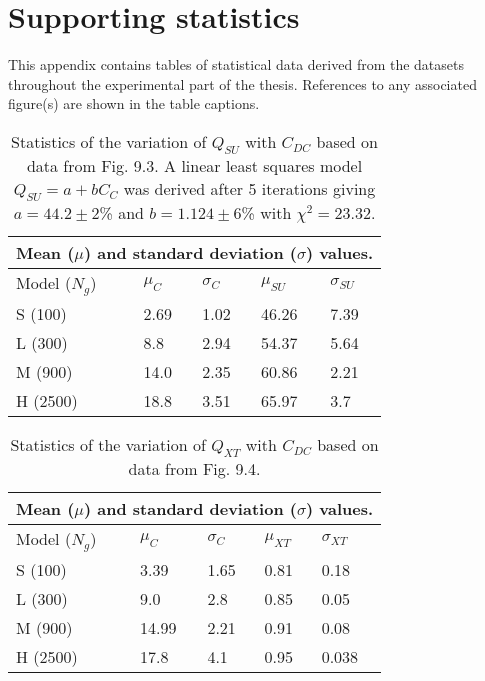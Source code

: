 \section{Supporting statistics}
\label{sect:app_stats}

This appendix contains tables of statistical data derived from the datasets throughout the experimental part of the thesis. References to any associated figure(s) are shown in the table captions.


\begin{table}[h]
\begin{center}
\begin{tabular}{lllll}
\toprule
\multicolumn{5}{c}{Mean ($\mu$) and standard deviation ($\sigma$) values.}\\
\midrule
Model ($N_g$)& $\mu_C$ & $\sigma_C$ &  $\mu_{SU}$ & $\sigma_{SU}$\\
\midrule
S (100)  & 2.69 & 1.02 & 46.26 & 7.39\\
L (300)  & 8.8 & 2.94 & 54.37 & 5.64\\
M (900)  & 14.0 & 2.35 & 60.86 & 2.21\\
H (2500) & 18.8 & 3.51 & 65.97 & 3.7\\
\bottomrule
\end{tabular}
\end{center}
\caption[Statistics of the variation of $Q_{SU}$ with $C_{DC}$.]{Statistics of the variation of $Q_{SU}$ with $C_{DC}$ based on data from Fig. 9.3. A linear least squares model $Q_{SU} = a + b C_C$ was derived after 5 iterations giving $a=44.2 \pm 2$\% and $b=1.124 \pm 6$\% with $\chi^2 = 23.32$.}
\label{b:f93}
\end{table}

\begin{table}[h]
\begin{center}
\begin{tabular}{lllll}
\toprule
\multicolumn{5}{c}{Mean ($\mu$) and standard deviation ($\sigma$) values.}\\
\midrule
Model ($N_g$)& $\mu_{C}$ & $\sigma_C$ &  $\mu_{XT}$ & $\sigma_{XT}$\\
\midrule
S (100)  & 3.39  & 1.65 & 0.81 & 0.18\\
L (300)  & 9.0   & 2.8  & 0.85 & 0.05\\
M (900)  & 14.99 & 2.21 & 0.91 & 0.08\\
H (2500) & 17.8  & 4.1  & 0.95 & 0.038\\
\bottomrule
\end{tabular}
\end{center}
\caption[Statistics of the variation of $Q_{XT}$ with $C_{DC}$]{Statistics of the variation of $Q_{XT}$ with $C_{DC}$ based on data from Fig. 9.4.}
\label{b:f94}
\end{table}

